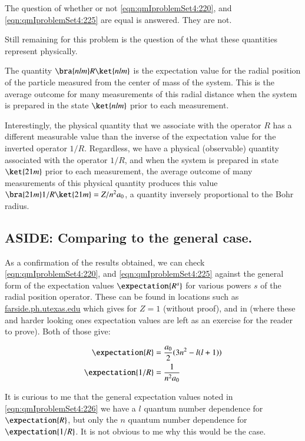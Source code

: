 The question of whether or not \ref{eqn:qmIproblemSet4:220}, and \ref{eqn:qmIproblemSet4:225} are equal is answered.  They are not.

Still remaining for this problem is the question of the what these quantities represent physically.

The quantity $\bra{nlm} R \ket{nlm}$ is the expectation value for the radial position of the particle measured from the center of mass of the system.  This is the average outcome for many measurements of this radial distance when the system is prepared in the state $\ket{nlm}$ prior to each measurement.

Interestingly, the physical quantity that we associate with the operator $R$ has a different measurable value than the inverse of the expectation value for the inverted operator $1/R$.  Regardless, we have a physical (observable) quantity associated with the operator $1/R$, and when the system is prepared in state $\ket{21m}$ prior to each measurement, the average outcome of many measurements of this physical quantity produces this value $\bra{21m} 1/R \ket{21m} = Z/n^2 a_0$, a quantity inversely proportional to the Bohr radius.

\subsection{ASIDE: Comparing to the general case.}

As a confirmation of the results obtained, we can check \ref{eqn:qmIproblemSet4:220}, and \ref{eqn:qmIproblemSet4:225} against the general form of the expectation values $\expectation{R^s}$ for various powers $s$ of the radial position operator.  These can be found in locations such as \href{http://farside.ph.utexas.edu/teaching/qmech/lectures/node81.html}{farside.ph.utexas.edu} which gives for $Z=1$ (without proof), and in \citep{liboff2003iqm} (where these and harder looking ones expectation values are left as an exercise for the reader to prove).  Both of those give:

\begin{align}\label{eqn:qmIproblemSet4:226}
\expectation{R} &= \frac{a_0}{2} ( 3 n^2 -l (l+1) ) \\
\expectation{1/R} &= \frac{1}{n^2 a_0} 
\end{align}

It is curious to me that the general expectation values noted in \ref{eqn:qmIproblemSet4:226} we have a $l$ quantum number dependence for $\expectation{R}$, but only the $n$ quantum number dependence for $\expectation{1/R}$.  It is not obvious to me why this would be the case.

